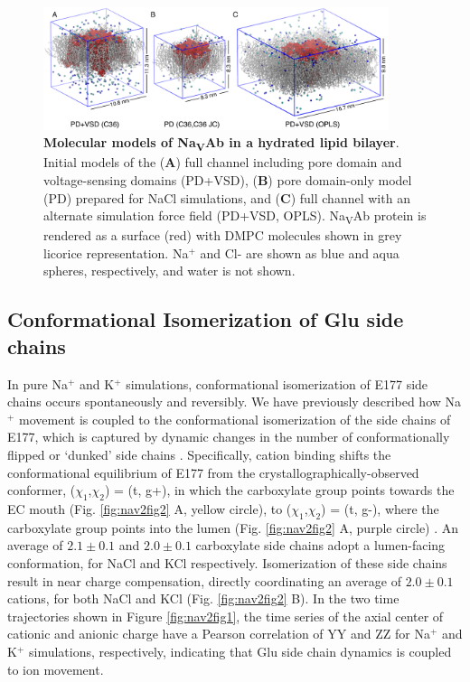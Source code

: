 \begin{refsection}
\begin{figure}[!ptb]
\centering
\includegraphics[width=0.9\textwidth]{nav2/Nav2FigS1}
\caption[Molecular models of Na\textsubscript{V}Ab in a hydrated lipid bilayer]{\textbf{Molecular models of Na\textsubscript{V}Ab in a hydrated lipid bilayer}. Initial models of the (\textbf{A}) full channel including pore domain and voltage-sensing domains (PD+VSD), (\textbf{B}) pore domain-only model (PD) prepared for NaCl simulations, and (\textbf{C}) full channel with an alternate simulation force field (PD+VSD, OPLS). Na\textsubscript{V}Ab protein is rendered as a surface (red) with DMPC molecules shown in grey licorice representation. Na$^+$ and Cl- are shown as blue and aqua spheres, respectively, and water is not shown. }
\label{fig:nav2figS1}
\end{figure}

\subsection{Conformational Isomerization of Glu side chains}
In pure Na$^+$ and K$^+$ simulations, conformational isomerization of E177 side chains occurs spontaneously and reversibly. We have previously described how  Na$^+$ movement is coupled to the conformational isomerization of the side chains of E177, which is captured by dynamic changes in the number of conformationally flipped or `dunked' side chains \cite{Chakrabarti:2013kd}. Specifically, cation binding shifts the conformational equilibrium of E177 from the crystallographically-observed conformer, ($\chi_1$,$\chi_2$) = (t, g+), in which the carboxylate group points towards the EC mouth (Fig. \ref{fig:nav2fig2} A, yellow circle), to ($\chi_1$,$\chi_2$) = (t, g-), where the carboxylate group points into the lumen (Fig. \ref{fig:nav2fig2} A, purple circle) \cite{Chakrabarti:2013kd}.  An average of $2.1\pm 0.1$ and $2.0\pm  0.1$ carboxylate side chains adopt a lumen-facing conformation, for NaCl and KCl respectively. Isomerization of these side chains result in near charge compensation, directly coordinating an average of $2.0\pm0.1$ cations, for both NaCl and KCl (Fig. \ref{fig:nav2fig2} B). In the two time trajectories shown in Figure \ref{fig:nav2fig1}, the time series of the axial center of cationic and anionic charge have a Pearson correlation of YY and ZZ for Na$^+$ and K$^+$ simulations, respectively, indicating that Glu side chain dynamics is coupled to ion movement. 


\end{refsection}
